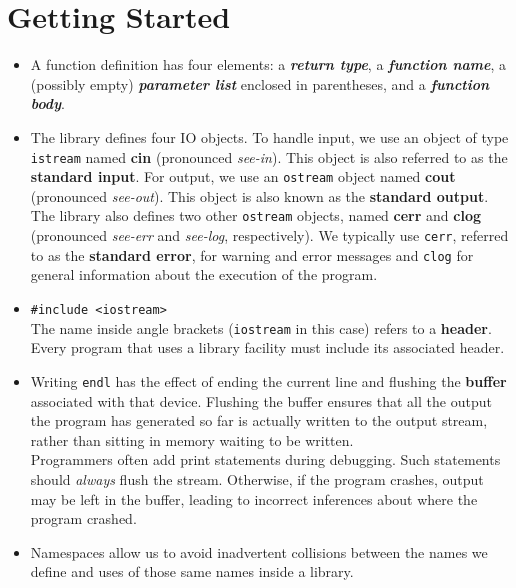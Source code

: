 \section{Getting Started}
\begin{itemize}

\item A function definition has four elements: a \textbf{\textit{return type}}, a \textbf{\textit{function name}}, a (possibly empty) \textbf{\textit{parameter list}} enclosed in parentheses, and a \textbf{\textit{function body}}.

\item The library defines four IO objects. To handle input, we use an object of type \texttt{istream} named \textbf{cin} (pronounced \textit{see-in}). This object is also referred to as the \textbf{standard input}. For output, we use an \texttt{ostream} object named \textbf{cout} (pronounced \textit{see-out}). This object is also known as the \textbf{standard output}. The library also defines two other \texttt{ostream} objects, named \textbf{cerr} and \textbf{clog} (pronounced \textit{see-err} and \textit{see-log}, respectively). We typically use \texttt{cerr}, referred to as the \textbf{standard error}, for warning and error messages and \texttt{clog} for general information about the execution of the program.

\item \hspace*{1em}\texttt{\#include <iostream>}\\The name inside angle brackets (\texttt{iostream} in this case) refers to a \textbf{header}. Every program that uses a library facility must include its associated header.

\item Writing \texttt{endl} has the effect of ending the current line and flushing the \textbf{buffer} associated with that device. Flushing the buffer ensures that all the output the program has generated so far is actually written to the output stream, rather than sitting in memory waiting to be written.\\Programmers often add print statements during debugging. Such statements should \textit{always} flush the stream. Otherwise, if the program crashes, output may be left in the buffer, leading to incorrect inferences about where the program crashed.

\item Namespaces allow us to avoid inadvertent collisions between the names we define and uses of those same names inside a library.


\end{itemize}
